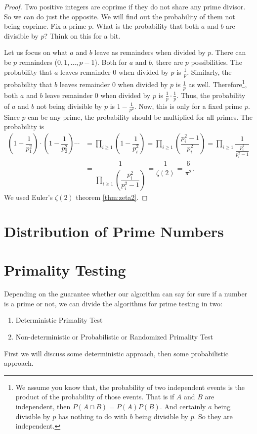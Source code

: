 \documentclass{subfiles}
\begin{document}
	\begin{proof}
		Two positive integers are coprime if they do not share any prime divisor. So we can do just the opposite. We will find out the probability of them not being coprime. Fix a prime $p$. What is the probability that both $a$ and $b$ are divisible by $p$? Think on this for a bit.
		
		Let us focus on what $a$ and $b$ leave as remainders when divided by $p$. There can be $p$ remainders ($0,1,\ldots,p-1$). Both for $a$ and $b$, there are $p$ possibilities. The probability that $a$ leaves remainder $0$ when divided by $p$ is $\frac{1}{p}$. Similarly, the probability that $b$ leaves remainder $0$ when divided by $p$ is $\frac{1}{p}$ as well. Therefore\footnote{We assume you know that, the probability of two independent events is the product of the probability of those events. That is if $A$ and $B$ are independent, then $P(A\cap B)=P(A)P(B)$. And certainly $a$ being divisible by $p$ has nothing to do with $b$ being divisible by $p$. So they are independent.}, both $a$ and $b$ leave remainder $0$ when divided by $p$ is $\frac{1}{p}\cdot\frac{1}{p}$. Thus, the probability of $a$ and $b$ not being divisible by $p$ is $1-\frac{1}{p^2}$. Now, this is only for a fixed prime $p$. Since $p$ can be any prime, the probability should be multiplied for all primes. The probability is
		\begin{align*}
			\left(1-\dfrac{1}{p_1^2}\right)\cdot\left(1-\dfrac{1}{p_2^2}\right)\cdots
			& = \prod_{i\geq1}\left(1-\dfrac{1}{p_i^2}\right) = \prod_{i\geq1}\left(\dfrac{p_i^2-1}{p_i^2}\right) = \prod_{i\geq1}\dfrac{1}{\frac{p_i^2}{p_i^2-1}}\\
			& = \dfrac{1}{\prod_{i\geq1}\left(\dfrac{p_i^2}{p_i^2-1}\right)}  = \dfrac{1}{\zeta(2)} = \dfrac{6}{\pi^2}.
		\end{align*}
		We used Euler's $\zeta(2)$ theorem \eqref{thm:zeta2}.
	\end{proof}
	
	\section{Distribution of Prime Numbers}
	
	
	
	\section{Primality Testing}\label{sec:primalitytesting}
	Depending on the guarantee whether our algorithm can say for sure if a number is a prime or not, we can divide the algorithms for prime testing in two:
	\begin{enumerate}
		\item Deterministic Primality Test
		\item Non-deterministic or Probabilistic or Randomized Primality Test 
	\end{enumerate}
	First we will discuss some deterministic approach, then some probabilistic approach.
	
\end{document}
